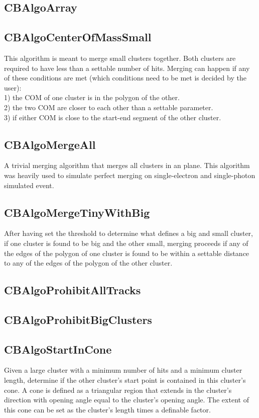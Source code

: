 \documentclass{article}
\begin{document}
\subsection{CBAlgoArray}\label{sec:CBAlgoArray}
\subsection{CBAlgoCenterOfMassSmall}\label{sec:CBAlgoCenterOfMassSmall}
This algorithm is meant to merge small clusters together. Both clusters are required to have less than a settable 
number of hits. Merging can happen if any of these conditions are met (which conditions need to be met is decided
by the user):\\
1) the COM of one cluster is in the polygon of the other.\\
2) the two COM are closer to each other than a settable parameter.\\
3) if either COM is close to the start-end segment of the other cluster.\\
\subsection{CBAlgoMergeAll}\label{sec:CBAlgoMergeAll}
A trivial merging algorithm that merges all clusters in an plane. This algorithm was heavily used to simulate
perfect merging on single-electron and single-photon simulated event.
\subsection{CBAlgoMergeTinyWithBig}\label{sec:CBAlgoMergeTinyWithBig}
After having set the threshold to determine what defines a big and small cluster, if one cluster is found to be
big and the other small, merging proceeds if any of the edges of the polygon of one cluster is found to be within
a settable distance to any of the edges of the polygon of the other cluster.
\subsection{CBAlgoProhibitAllTracks}\label{sec:CBAlgoProhibitAllTracks}
\subsection{CBAlgoProhibitBigClusters}\label{sec:CBAlgoProhibitBigClusters}
\subsection{CBAlgoStartInCone}\label{sec:CBAlgoStartInCone}
Given a large cluster with a minimum number of hits and a minimum cluster length, determine if the other cluster's
start point is contained in this cluster's cone. A cone is defined as a triangular region that extends in the cluster's
direction with opening angle equal to the cluster's opening angle. The extent of this cone can be set as the cluster's length
times a definable factor.
\end{document}

